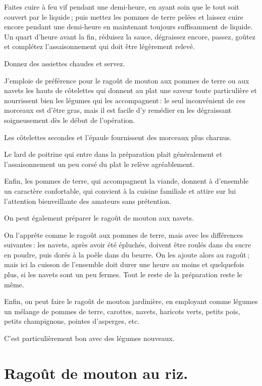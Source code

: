 Faites cuire à feu vif pendant une demi-heure, en ayant soin que le tout soit
couvert par le liquide ; puis mettez les pommes de terre pelées et laissez
cuire encore pendant une demi-heure en maintenant toujours suffisamment de
liquide. Un quart d'heure avant la fin, réduisez la sauce, dégraissez encore,
passez, goûtez et complétez l'assaisonnement qui doit être légèrement relevé.

Donnez des assiettes chaudes et servez.

J'emploie de préférence pour le ragoût de mouton aux pommes de terre ou aux
navets les hauts de côtelettes qui donnent au plat une saveur toute
particulière et nourrissent bien les légumes qui les accompagnent : le seul
inconvénient de ces morceaux est d'être gras, mais il est facile d'y remédier
en les dégraissant soigneusement dès le début de l'opération.

Les côtelettes secondes et l'épaule fournissent des morceaux plus charnus.

Le lard de poitrine qui entre dans la préparation plait généralement et
l'assaisonnement un peu corsé du plat le relève agréablement.

Enfin, les pommes de terre, qui accompagnent la viande, donnent à d'ensemble un
caractère confortable, qui convient à la cuisine familiale et attire sur lui
l'attention bienveillante des amateurs sans prétention.

\sk

On peut également préparer le ragoût de mouton aux navets.

On l'apprête comme le ragoût aux pommes de terre, mais avec les différences
suivantes : les navets, après avoir été épluchés, doivent être roulés dans du
sucre en poudre, puis dorés à la poêle dans du beurre. On les ajoute alors au
ragoût ; mais ici la cuisson de l'ensemble doit durer une heure au moins et
quelquefois plus, si les navets sont un peu fermes. Tout le reste de la
préparation reste le même.

\sk

Enfin, on peut faire le ragoût de mouton jardinière, en employant comme légumes
un mélange de pommes de terre, carottes, navets, haricots verts, petits pois,
petits champignons, pointes d'asperges, etc.

C'est particulièrement bon avec des légumes nouveaux.

\section*{\centering Ragoût de mouton au riz.}
{}


